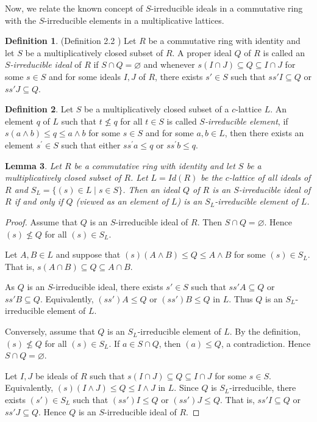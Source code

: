 \documentclass[10pt,twoside,a4]{amsart}
\numberwithin{equation}{section}
\theoremstyle{plain}
\newtheorem{lem}{Lemma}[section]
\theoremstyle{definition}
\newtheorem{definition}[lem]{Definition}
\begin{document}
Now, we relate the known  concept of $S$-irreducible ideals in a commutative ring with the $S$-irreducible elements in a multiplicative lattices.

\begin{definition} (Definition 2.2 \cite{SAK})
	Let $R$ be a commutative ring with identity and let $S$ be a multiplicatively
	closed subset of $R$.
	A proper ideal $Q$ of $R$ is called an \emph{$S$-irreducible ideal} of $R$ if
	$S\cap Q=\varnothing$ and whenever
	$s(I\cap J)\subseteq Q\subseteq I\cap J$
	for some $s\in S$ and for some ideals $I,J$ of $R$,
	there exists $s'\in S$ such that
	$ss'I\subseteq Q$ or $ss'J\subseteq Q$.
\end{definition}

\begin{definition}
	Let $S$ be a multiplicatively closed subset of a $c$-lattice $L$. An element $q$ of $L$ such that $t\nleq q$ for all $t\in S$ is called \textit{$S$-irreducible element}, if $s(a\wedge b)\leq q \leq a\wedge b$ for some $s\in S$ and for some $a,b\in L$, then there exists an element $s^{\prime}\in S$ such that either $ss^{\prime}a\leq q$ or $ss^{\prime}b\leq q$.	
\end{definition}



\begin{lem}\label{thm:S-irreducible-ideal-lattice}
	Let $R$ be a commutative ring with identity and let $S$ be a multiplicatively
	closed subset of $R$.
	Let $L=Id(R)$ be the $c$-lattice of all ideals of $R$ and
	$S_L=\{(s)\in L \mid s\in S\}$.
	Then an ideal $Q$ of $R$ is an $S$-irreducible ideal of $R$ if and only if
	$Q$ (viewed as an element of $L$) is an $S_L$-irreducible element of $L$.
\end{lem}

\begin{proof}
	Assume that $Q$ is an $S$-irreducible ideal of $R$.
	Then $S\cap Q=\varnothing$.
	Hence $(s)\nleq Q$ for all $(s)\in S_L$.
	
	Let $A,B\in L$ and suppose that
	$(s)(A\wedge B)\leq Q\leq A\wedge B$
	for some $(s)\in S_L$.
	That is,
	$s(A\cap B)\subseteq Q\subseteq A\cap B$.

	As $Q$ is an $S$-irreducible ideal, there exists $s'\in S$ such that
	$ss'A\subseteq Q$ or $ss'B\subseteq Q$.
	Equivalently,
	$(ss')A\leq Q$ or $(ss')B\leq Q$ in $L$.
	Thus $Q$ is an $S_L$-irreducible element of $L$.
	
	Conversely, assume that $Q$ is an $S_L$-irreducible element of $L$.
	By the definition, $(s)\nleq Q$ for all $(s)\in S_L$.
	If $a\in S\cap Q$, then $(a)\leq Q$, a contradiction.
	Hence $S\cap Q=\varnothing$.
	
	Let $I,J$ be ideals of $R$ such that
	$s(I\cap J)\subseteq Q\subseteq I\cap J$
	for some $s\in S$.
	Equivalently,
	$(s)(I\wedge J)\leq Q\leq I\wedge J$ in $L$.
	Since $Q$ is $S_L$-irreducible, there exists $(s')\in S_L$ such that
	$(ss')I\leq Q$ or $(ss')J\leq Q$.
	That is,
	$ss'I\subseteq Q$ or $ss'J\subseteq Q$.
	Hence $Q$ is an $S$-irreducible ideal of $R$.
\end{proof}
\end{document}
